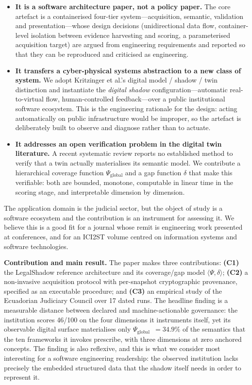 \documentclass[11pt,a4paper]{article}
\newcommand{\Psiglob}{$\Psi_{\mathrm{global}}$}
\begin{document}
\begin{itemize}
  \item \textbf{It is a software architecture paper, not a policy paper.} The core artefact is a containerised four-tier system---acquisition, semantic, validation and presentation---whose design decisions (unidirectional data flow, container-level isolation between evidence harvesting and scoring, a parameterised acquisition target) are argued from engineering requirements and reported so that they can be reproduced and criticised as engineering.
  \item \textbf{It transfers a cyber-physical systems abstraction to a new class of system.} We adopt Kritzinger et al.'s digital model / shadow / twin distinction and instantiate the \emph{digital shadow} configuration---automatic real-to-virtual flow, human-controlled feedback---over a public institutional software ecosystem. This is the engineering rationale for the design: acting automatically on public infrastructure would be improper, so the artefact is deliberately built to observe and diagnose rather than to actuate.
  \item \textbf{It addresses an open verification problem in the digital twin literature.} A recent systematic review reports no established method to verify that a twin actually materialises its semantic model. We contribute a hierarchical coverage function \Psiglob{} and a gap function $\delta$ that make this verifiable: both are bounded, monotone, computable in linear time in the scoring stage, and interpretable dimension by dimension.
\end{itemize}

The application domain is the judicial sector, but the object of study is a software ecosystem and the contribution is an instrument for assessing it. We believe this is a good fit for a journal whose remit is engineering work presented at conferences, and for an ICI2ST volume centred on information systems and software technologies.

\vspace{4pt}
\textbf{Contribution and main result.}
The paper makes three contributions: \textbf{(C1)} the LegalShadow reference architecture and its coverage/gap model $\langle\Psi,\delta\rangle$; \textbf{(C2)} a non-invasive acquisition protocol with per-snapshot cryptographic provenance, specified as an executable procedure; and \textbf{(C3)} an empirical study of the Ecuadorian Judiciary Council over 17 dated runs. The headline finding is a measurable distance between declared and machine-actionable governance: the institution scores 46/100 on the four dimensions it instruments itself, yet its observable digital surface materialises only \Psiglob{}~$=34.9\%$ of the semantics that the ten frameworks it invokes prescribe, with three dimensions at zero anchored concepts. The finding is also reflexive, and this is what we consider most interesting for a software engineering readership: the observed institution lacks precisely the embedded structured data that the shadow itself needs in order to represent it.
\end{document}
